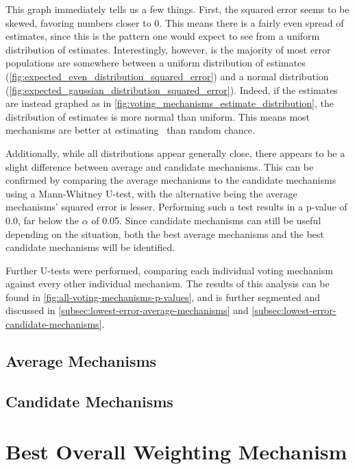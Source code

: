 This graph immediately tells us a few things.
First, the squared error seems to be skewed, favoring numbers closer to 0.
This means there is a fairly even spread of estimates, since this is the
pattern one would expect to see from a uniform distribution of estimates.
Interestingly, however, is the majority of most error populations are
somewhere between a uniform distribution of estimates
(\autoref{fig:expected_even_distribution_squared_error}) and a normal
distribution (\autoref{fig:expected_gaussian_distribution_squared_error}).
Indeed, if the estimates are instead graphed as in
\autoref{fig:voting_mechanisms_estimate_distribution}, the distribution of estimates
is more normal than uniform.
This means most mechanisms are better at estimating \truth\ than random chance.

Additionally, while all distributions appear generally close, there appears to be a
slight difference between average and candidate mechanisms.
This can be confirmed by comparing the average mechanisms to the candidate mechanisms
using a Mann-Whitney U-test, with the alternative being the average mechanisms'
squared error is lesser.
Performing such a test results in a p-value of 0.0, far below the $\alpha$ of 0.05.
Since candidate mechanisms can still be useful depending on the situation, both the
best average mechanisms and the best candidate mechanisms will be identified.

Further U-tests were performed, comparing each individual voting mechanism against
every other individual mechanism.
The results of this analysis can be found in
\autoref{fig:all-voting-mechanisms-p-values}, and is further segmented and discussed in
\autoref{subsec:lowest-error-average-mechanisms} and
\autoref{subsec:lowest-error-candidate-mechanisms}.

\subsection{Average Mechanisms}\label{subsec:lowest-error-average-mechanisms}

\subsection{Candidate Mechanisms}\label{subsec:lowest-error-candidate-mechanisms}


\section{Best Overall Weighting Mechanism}\label{sec:best-overall-weighting-mechanism}


